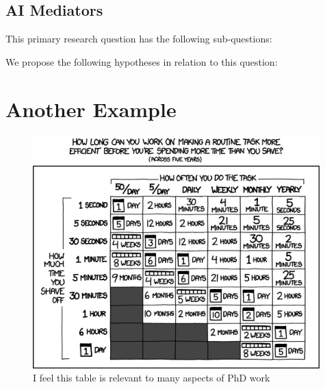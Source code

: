 \begin{hypothesis}
	\label{hyp:diplomatic.second}
	\HDiplomaticB
\end{hypothesis}

\clearpage

\subsection{AI Mediators}
\label{subsec:example.rq.minds}

\begin{researchquestion}
	\label{rq:minds}
	\RQMinds
\end{researchquestion}

This primary research question has the following sub-questions:

\begin{subquestion}
	\label{srq:minds.a}
	\SRQMindsA
\end{subquestion}

\begin{subquestion}
	\label{srq:minds.b}
	\SRQMindsB
\end{subquestion}

We propose the following hypotheses in relation to this question:

\begin{hypothesis}
	\label{hyp:minds.first}
	\HMindsA
\end{hypothesis}

\begin{hypothesis}
	\label{hyp:minds.second}
	\HMindsB
\end{hypothesis}


\clearpage


\section{Another Example}
\label{sec:example.another}

\begin{figure}[h!]
	\centering
	\captionsetup{justification=centering}
	\includegraphics[height=9cm]{images/examples/xkcd_1205_is_it_worth_the_time_2x.png}
	\caption[Example figure B]{I feel this table is relevant to many aspects of PhD work\protect\footnotemark}
	\label{fig:example.b}
\end{figure}


